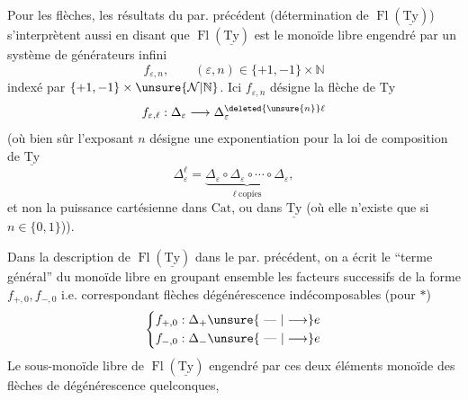 

Pour  les flèches, les résultats  \unsure{]} du par. précédent (détermination de $\operatorname{Fl}(\underline{\mathrm{Ty}})$) s'interprètent aussi en disant que $\operatorname{Fl}(\underline{\mathrm{Ty}})$ est le monoïde libre engendré par un système de générateurs infini
\[
f_{\varepsilon,n},\qquad(\varepsilon,n)\in\{+1,-1\}\times\mathbb N
\]
indexé par   $\{+1,-1\}\times\unsure{\mathcal N|\mathbb N}$. Ici $f_{\varepsilon,n}$ désigne la  flèche de $\mathrm{Ty}$
\[
f_{\varepsilon,\ell}:\Delta_\varepsilon\longrightarrow\Delta_\varepsilon^{\deleted{\unsure{n}}\ell}
\]
(où bien sûr l'exposant $n$ désigne une exponentiation pour la loi de composition de $\underline{\mathrm{Ty}}$
\[
\Delta_\varepsilon^\ell=\underbrace{\Delta_\varepsilon\circ\Delta_\varepsilon\circ\cdots\circ\Delta_\varepsilon}_{\ell\ \text{copies}},
\]
et non la puissance cartésienne dans $\mathrm{Cat}$, ou dans $\underline{\mathrm{Ty}}$ (où elle n'existe que si $n\in\{0,1\}$)).

 Dans la description de $\operatorname{Fl}(\underline{\mathrm{Ty}})$ dans le par. précédent, on a écrit le ``terme général'' du monoïde libre en groupant ensemble les  facteurs successifs de la forme $f_{+,0}, f_{-,0}$ i.e. correspondant  flèches  dégénérescence indécomposables (pour $*$)
\[
\left\{\begin{aligned}
 f_{+,0}:{}&\Delta_+\unsure{\text{ --- }|\longrightarrow}e\\
 f_{-,0}:{}&\Delta_-\unsure{\text{ --- }|\longrightarrow}e
\end{aligned}\right.
\]
Le  sous-monoïde libre de $\operatorname{Fl}(\underline{\mathrm{Ty}})$ engendré par ces deux éléments  monoïde des flèches de dégénérescence  quelconques,
